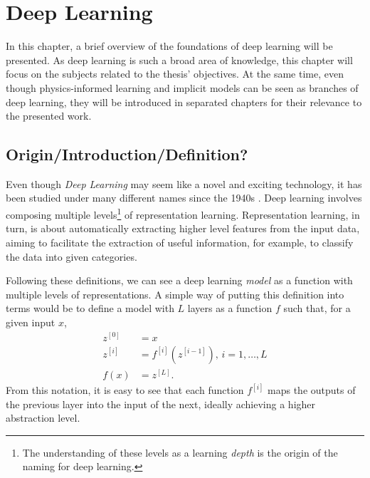 \chapter{Deep Learning}\label{cap:deep-learning}

In this chapter, a brief overview of the foundations of deep learning will be presented. As deep learning is such a broad area of knowledge, this chapter will focus on the subjects related to the thesis' objectives. At the same time, even though physics-informed learning and implicit models can be seen as branches of deep learning, they will be introduced in separated chapters for their relevance to the presented work.

\section{Origin/Introduction/Definition?}

Even though \textit{Deep Learning} may seem like a novel and exciting technology, it has been studied under many different names since the 1940s \cite{goodfellow_deep_2016}.
Deep learning involves composing multiple levels\footnote{The understanding of these levels as a learning \textit{depth} is the origin of the naming for deep learning.} of representation learning.
Representation learning, in turn, is about automatically extracting higher level features from the input data\cite{lecun_deep_2015,bengio_representation_2013}, aiming to facilitate the extraction of useful information, for example, to classify the data into given categories.

Following these definitions, we can see a deep learning \textit{model} as a function with multiple levels of representations.
A simple way of putting this definition into terms would be to define a model with $L$ layers as a function $f$ such that, for a given input $x$,
\begin{align*}
    z^{[0]} &= x \\
    z^{[i]} &= f^{[i]}(z^{[i-1]}),\,i=1,\ldots,L \\
    f(x) &= z^{[L]}
.\end{align*}
From this notation, it is easy to see that each function $f^{[i]}$ maps the outputs of the previous layer into the input of the next, ideally achieving a higher abstraction level.

